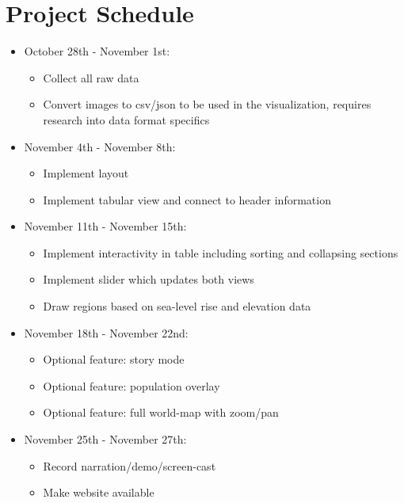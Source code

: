 \documentclass[12pt]{article}
\begin{document}
	\section{Project Schedule}
		\begin{itemize}
			\item
				October 28th - November 1st:
				\begin{itemize}
					\item
						Collect all raw data

					\item
						Convert images to csv/json to be used in the visualization, requires research into data format specifics
				\end{itemize}

			\item
				November 4th - November 8th:
				\begin{itemize}
					\item
						Implement layout

					\item
						Implement tabular view and connect to header information
				\end{itemize}

			\item
				November 11th - November 15th:
				\begin{itemize}
					\item
						Implement interactivity in table including sorting and collapsing sections

					\item
						Implement slider which updates both views

					\item
						Draw regions based on sea-level rise and elevation data
				\end{itemize}

			\item
				November 18th - November 22nd:
				\begin{itemize}
					\item
						Optional feature: story mode

					\item
						Optional feature: population overlay

					\item
						Optional feature: full world-map with zoom/pan
				\end{itemize}

			\item
				November 25th - November 27th:
				\begin{itemize}
					\item
						Record narration/demo/screen-cast

					\item
						Make website available
				\end{itemize}
		\end{itemize}
\end{document}
